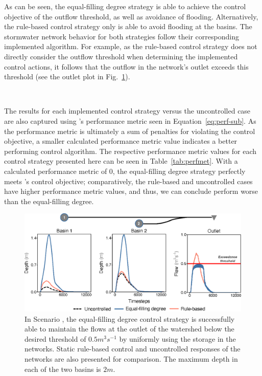 As can be seen, the equal-filling degree strategy is able to achieve the control objective of the outflow threshold, as well as avoidance of flooding. Alternatively, the rule-based control strategy only is able to avoid flooding at the basins. The stormwater network behavior for both strategies follow their corresponding implemented algorithm. For example, as the rule-based control strategy does not directly consider the outflow threshold when determining the implemented control actions, it follows that the outflow in the network's outlet exceeds this threshold (see the outlet plot in Fig.~\ref{fig:results}). 

\

The results for each implemented control strategy versus the uncontrolled case are also captured using 's performance metric seen in Equation~\ref{eq:perf-sub}. As the performance metric is ultimately a sum of penalties for violating the control objective, a smaller calculated performance metric value indicates a better performing control algorithm. The respective performance metric values for each control strategy presented here can be seen in Table~\ref{tab:perfmet}. With a calculated performance metric of $0$, the equal-filling degree strategy perfectly meets 's control objective; 
comparatively, the rule-based and uncontrolled cases have higher performance metric values, and thus, we can conclude perform worse than the equal-filling degree.
%
%
%
\begin{figure}
    \centering
    \includegraphics[width=\linewidth]{gfx/Chapter-5/equalfilling.eps}
    \caption{In Scenario , the equal-filling degree control strategy is successfully able to maintain the flows at the outlet of the watershed below the desired threshold of $0.5 \unit{m^3s^{-1}}$ by uniformly using the storage in the networks. Static rule-based control and uncontrolled responses of the networks are also presented for comparison. The maximum depth in each of the two basins is $2 \unit{m}$.}
    \label{fig:results}
\end{figure}
